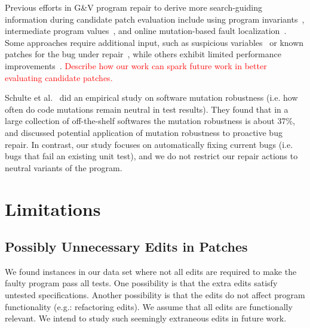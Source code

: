 \documentclass[sigconf, timestamp-false, anonymous=true]{acmart}
\newcommand\todo[1]{\textcolor{red}{#1}}
\begin{document}
Previous efforts in G\&V program repair to derive more search-guiding information 
during candidate patch evaluation 
include using program invariants~\cite{better-fitness, dinglyu}, 
intermediate program values~\cite{source-code-checkpoint}, 
and online mutation-based fault localization~\cite{mut-analysis}.
Some approaches require additional input, such as suspicious variables~\cite{source-code-checkpoint} 
or known patches for the bug under repair~\cite{better-fitness}, 
while others exhibit limited performance improvements~\cite{dinglyu, mut-analysis}.
\todo{Describe how our work can spark future work in better evaluating candidate patches.}

Schulte et al.~\cite{schulte} did an empirical study on software mutation robustness 
(i.e. how often do code mutations remain neutral in test results). 
They found that in a large collection of off-the-shelf softwares the mutation robustness is about 37\%, 
and discussed potential application of mutation robustness to proactive bug repair. 
In contrast, our study focuses on automatically fixing current bugs (i.e. bugs that fail an existing unit test), 
and we do not restrict our repair actions to neutral variants of the program.

\section{Limitations}

\subsection{Possibly Unnecessary Edits in Patches}

We found instances in our data set where not all edits are required to 
make the faulty program pass all tests. One possibility is that the extra 
edits satisfy untested specifications. Another possibility is that the edits 
do not affect program functionality (e.g.: refactoring edits). We assume 
that all edits are functionally relevant. We intend to study such seemingly
extraneous edits in future work.



\end{document}
